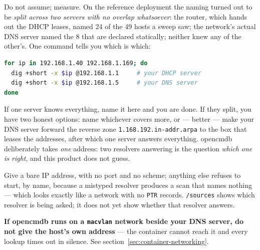 \documentclass[11pt,oneside,listof=totoc,bibliography=totoc]{scrreprt}
\begin{document}
\begin{description}[style=nextline,leftmargin=0pt]
    Do not assume; measure. On the reference deployment the naming turned out to be \emph{split
    across two servers with no overlap whatsoever}: the router, which hands out the DHCP leases,
    named 24 of the 49 hosts a sweep saw; the network's actual DNS server named the 8 that are
    declared statically; neither knew any of the other's. One command tells you which is which:

\begin{lstlisting}[language=bash]
for ip in 192.168.1.40 192.168.1.169; do
  dig +short -x $ip @192.168.1.1     # your DHCP server
  dig +short -x $ip @192.168.1.5     # your DNS server
done
\end{lstlisting}

    If one server knows everything, name it here and you are done. If they split, you have two
    honest options: name whichever covers more, or --- better --- make your DNS server forward the
    reverse zone \texttt{1.168.192.in-addr.arpa} to the box that leases the addresses, after which
    one server answers everything. opencmdb deliberately takes \emph{one} address: two resolvers
    answering is the question \emph{which one is right}, and this product does not guess.

    Give a bare IP address, with no port and no scheme; anything else refuses to start, by name,
    because a mistyped resolver produces a scan that names nothing --- which looks exactly like a
    network with no \texttt{PTR} records. \texttt{/sources} shows which resolver is being asked;
    it does not yet show whether that resolver answers.

    \textbf{If opencmdb runs on a \texttt{macvlan} network beside your DNS server, do not give
    the host's own address} --- the container cannot reach it and every lookup times out in
    silence. See section~\ref{sec:container-networking}.
\end{description}
\end{document}
